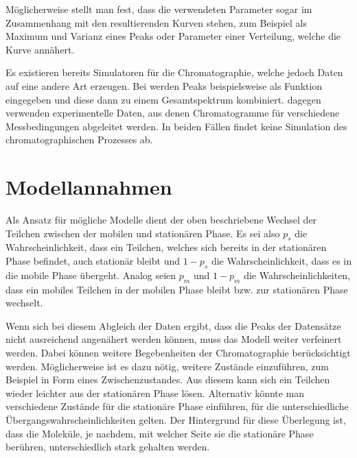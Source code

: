 \documentclass[a4paper,10pt]{article}
\begin{document}


Möglicherweise stellt man fest, dass die verwendeten Parameter sogar im Zusammenhang mit den resultierenden Kurven stehen, zum Beispiel als Maximum und Varianz eines Peaks oder Parameter einer Verteilung, welche die Kurve annähert. 

Es existieren bereits Simulatoren für die Chromatographie, welche jedoch Daten auf eine andere Art erzeugen. Bei \cite{spreadsheet} werden Peaks beispielsweise als Funktion eingegeben und diese dann zu einem Gesamtspektrum kombiniert. \cite{hplcsim} dagegen verwenden experimentelle Daten, aus denen Chromatogramme für verschiedene Messbedingungen abgeleitet werden. In beiden Fällen findet keine Simulation des chromatographischen Prozesses ab.

\section{Modellannahmen}
Als Ansatz für mögliche Modelle dient der oben beschriebene Wechsel der Teilchen zwischen der mobilen und stationären Phase. 
Es sei also $p_s$ die Wahrscheinlichkeit, dass ein Teilchen, welches sich bereits in der stationären Phase befindet, auch stationär bleibt und $1-p_s$ die Wahrscheinlichkeit, dass es in die mobile Phase übergeht. Analog seien $p_m$ und $1-p_m$ die Wahrscheinlichkeiten, dass ein mobiles Teilchen in der mobilen Phase bleibt bzw. zur stationären Phase wechselt. 

Wenn sich bei diesem Abgleich der Daten ergibt, dass die Peaks der Datensätze nicht ausreichend angenähert werden können, muss das Modell weiter verfeinert werden. Dabei können weitere Begebenheiten der Chromatographie berücksichtigt werden. Möglicherweise ist es dazu nötig, weitere Zustände einzuführen, zum Beispiel in Form eines Zwischenzustandes. Aus diesem kann sich ein Teilchen wieder leichter aus der stationären Phase lösen. Alternativ könnte man verschiedene Zustände für die stationäre Phase einführen, für die unterschiedliche Übergangswahrscheinlichkeiten gelten. Der Hintergrund für diese Überlegung ist, dass die Moleküle, je nachdem, mit welcher Seite sie die stationäre Phase berühren, unterschiedlich stark gehalten werden.
\end{document}
